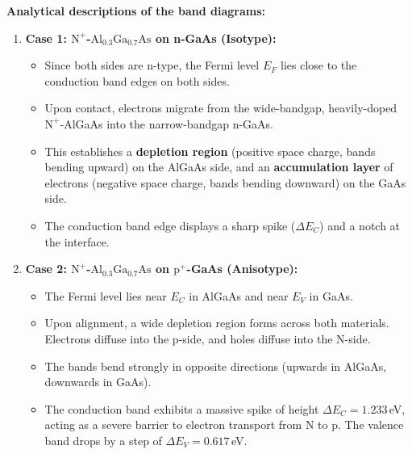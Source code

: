 \begin{center}
\begin{minipage}{0.48\textwidth}
\end{minipage}
\end{center}

\textbf{Analytical descriptions of the band diagrams:}

\begin{enumerate}
  \item \textbf{Case 1: $\text{N}^+$-$\text{Al}_{0.3}\text{Ga}_{0.7}\text{As}$ on n-GaAs (Isotype):}
  \begin{itemize}
    \item Since both sides are n-type, the Fermi level $E_F$ lies close to the conduction band edges on both sides.
    \item Upon contact, electrons migrate from the wide-bandgap, heavily-doped $\text{N}^+$-AlGaAs into the narrow-bandgap n-GaAs.
    \item This establishes a \textbf{depletion region} (positive space charge, bands bending upward) on the AlGaAs side, and an \textbf{accumulation layer} of electrons (negative space charge, bands bending downward) on the GaAs side.
    \item The conduction band edge displays a sharp spike ($\Delta E_C$) and a notch at the interface.
  \end{itemize}
  \item \textbf{Case 2: $\text{N}^+$-$\text{Al}_{0.3}\text{Ga}_{0.7}\text{As}$ on $\text{p}^+$-GaAs (Anisotype):}
  \begin{itemize}
    \item The Fermi level lies near $E_C$ in AlGaAs and near $E_V$ in GaAs.
    \item Upon alignment, a wide depletion region forms across both materials. Electrons diffuse into the p-side, and holes diffuse into the N-side.
    \item The bands bend strongly in opposite directions (upwards in AlGaAs, downwards in GaAs).
    \item The conduction band exhibits a massive spike of height $\Delta E_C = 1.233$\,eV, acting as a severe barrier to electron transport from N to p. The valence band drops by a step of $\Delta E_V = 0.617$\,eV.
  \end{itemize}
\end{enumerate}


